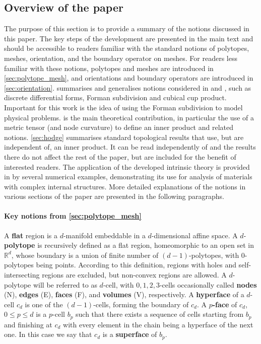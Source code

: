 \documentclass{elsarticle}
\theoremstyle{definition}
\newcommand{\R}{\mathbb{R}} %
\begin{document}
\subsection{Overview of the paper}
\label{sec:overview}
The purpose of this section is to provide a summary of the notions discussed in this paper. The key steps of the development are presented in the main text and should be accessible to readers familiar with the standard notions of polytopes, meshes, orientation, and the boundary operator on meshes. For readers less familiar with these notions, polytopes and meshes are introduced in \ref{sec:polytope_mesh}, and orientations and boundary operators are introduced in \ref{sec:orientation}.  summarises and generalises notions considered in \cite{Forman2002_Novikov} and \cite{arnold2012discrete}, such as discrete differential forms, Forman subdivision and cubical cup product. Important for this work is the idea of using the Forman subdivision to model physical problems.  is the main theoretical contribution, in particular the use of a metric tensor (and node curvature) to define an inner product and related notions. \ref{sec:hodge} summarises standard topological results that use, but are independent of, an inner product. It can be read independently of  and the results there do not affect the rest of the paper, but are included for the benefit of interested readers. The application of the developed intrinsic theory is provided in  by several numerical examples, demonstrating its use for analysis of materials with complex internal structures. More detailed explanations of the notions in various sections of the paper are presented in the following paragraphs.
 
\paragraph{Key notions from \ref{sec:polytope_mesh}}
A \textbf{flat} region is a $d$-manifold embeddable in a $d$-dimensional affine space.
A $d$-\textbf{polytope} is recursively defined as a flat region, homeomorphic to an open set in $\R^d$, whose boundary is a union of finite number of $(d-1)$-polytopes, with $0$-polytopes being points. According to this definition, regions with holes and self-intersecting regions are excluded, but non-convex regions are allowed. A $d$-polytope will be referred to as $d$-cell, with $0,1,2,3$-cells occasionally called \textbf{nodes} (N), \textbf{edges} (E), \textbf{faces} (F), and \textbf{volumes} (V), respectively. A \textbf{hyperface} of a $d$-cell $c_d$ is one of the $(d-1)$-cells, forming the boundary of $c_d$.
A \textbf{$p$-face} of $c_d$, $0 \leq p \leq d$ is a $p$-cell $b_p$ such that there exists a sequence of cells starting from $b_p$ and finishing at $c_d$ with every element in the chain being a hyperface of the next one. 
In this case we say that $c_d$ is a \textbf{superface} of $b_p$.
\end{document}
